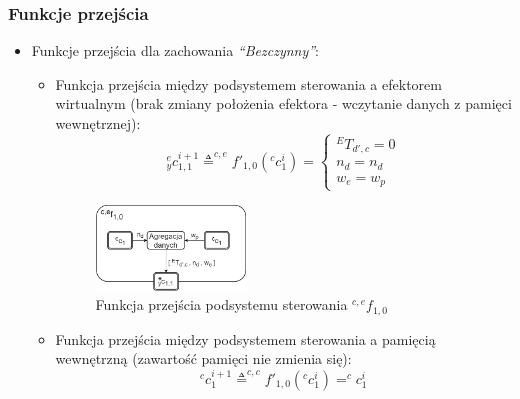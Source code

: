 \documentclass{article}
\begin{document}

\subsubsection{Funkcje przej\'scia}
\begin{itemize}

\item Funkcje przej\'scia dla zachowania \textit{``Bezczynny''}:
\begin{itemize}
\item Funkcja przej\'scia między podsystemem sterowania a efektorem wirtualnym (brak zmiany położenia efektora - wczytanie danych z pamięci wewnętrznej):
\[ ^e_yc_{1,1}^{i+1} \triangleq ^{c,e}f'_{1,0}(^cc_1^i) =
\begin{cases}
^ET_{d',c} = 0 \\
 n_d = n_d \\
w_e = w_p
\end{cases}\]
\begin{figure}[H]
	\centering
	\includegraphics[width=0.4\textwidth]{PS_funkcje1v0.png}
	\caption{Funkcja przej\'scia podsystemu sterowania $^{c,e}f_{1,0}$}
	\label{fig::PS_funkcje1v0}
\end{figure}
\item Funkcja przej\'scia między podsystemem sterowania a pamięcią wewnętrzną (zawarto\'sć pamięci nie zmienia się):
\[ ^cc_1^{i+1} \triangleq ^{c,c}f'_{1,0}(^cc_1^i)=^cc_1^i\]
\end{itemize}


\end{itemize}
\end{document}
